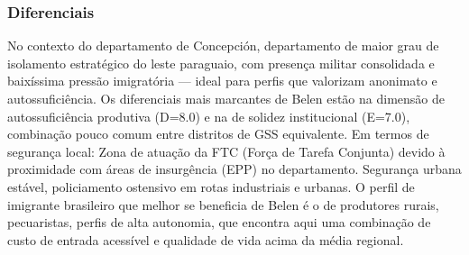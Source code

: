 \subsubsection*{Diferenciais}\label{dif-belen-0102}
No contexto do departamento de Concepción, departamento de maior grau de isolamento estratégico do leste paraguaio, com presença militar consolidada e baixíssima pressão imigratória — ideal para perfis que valorizam anonimato e autossuficiência. Os diferenciais mais marcantes de Belen estão na dimensão de autossuficiência produtiva (D=8.0) e na de solidez institucional (E=7.0), combinação pouco comum entre distritos de GSS equivalente. Em termos de segurança local: Zona de atuação da FTC (Força de Tarefa Conjunta) devido à proximidade com áreas de insurgência (EPP) no departamento. Segurança urbana estável, policiamento ostensivo em rotas industriais e urbanas. O perfil de imigrante brasileiro que melhor se beneficia de Belen é o de produtores rurais, pecuaristas, perfis de alta autonomia, que encontra aqui uma combinação de custo de entrada acessível e qualidade de vida acima da média regional.
